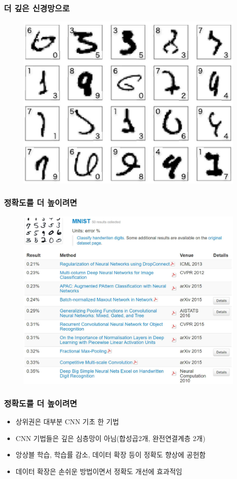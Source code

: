 \documentclass{beamer}
\begin{document}
\begin{frame}
	\frametitle{더 깊은 신경망으로}
	\begin{figure}
		\includegraphics[width=0.6\columnwidth]{Fig_deep/Figure_2.pdf}
	\end{figure}
\end{frame}

\begin{frame}
	\frametitle{정확도를 더 높이려면}
	\begin{figure}
		\includegraphics[width=0.7\columnwidth]{Fig_deep/Figure_3.pdf}
	\end{figure}
\end{frame}

\begin{frame}
	\frametitle{정확도를 더 높이려면}
	\begin{itemize}
		\item 상위권은 대부분 CNN 기초 한 기법
		\item CNN 기법들은 깊은 심층망이 아님(합성곱2개, 완전연결계층 2개)
		\item 앙상블 학습, 학습률 감소, 데이터 확장 등이 정확도 향상에 공헌함
		\item 데이터 확장은 손쉬운 방법이면서 정확도 개선에 효과적임
	\end{itemize}
\end{frame}
\end{document}
